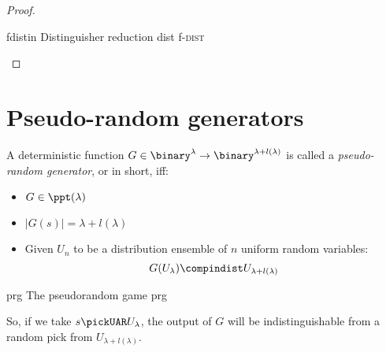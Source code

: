 \begin{proof}
    \begin{cryptoredux}
        {fdistin}
        {Distinguisher reduction}
        {dist}
        {f-\textsc{dist}}
        
      
        

        
    \end{cryptoredux}

\end{proof}


\section{Pseudo-random generators}

A deterministic function $G \in \binary^\lambda \to \binary^{\lambda + l(\lambda)}$ is called a \emph{pseudo-random generator}, or \prg{} in short, iff:

\begin{itemize}
    \item $G \in \ppt(\lambda)$
    \item $|G(s)| = \lambda + l(\lambda)$ %
    \item Given $U_n$ to be a distribution ensemble of $n$ uniform random variables:
    \[
        G(U_{\lambda}) \compindist U_{\lambda + l(\lambda)}
    \]
\end{itemize}

\begin{cryptogame}
    {prg}
    {The pseudorandom game}
    {prg}
    

    \cseqdelay

    
\end{cryptogame}

So, if we take $s \pickUAR U_\lambda$, the output of $G$ will be indistinguishable from a random pick from $U_{\lambda + l(\lambda)}$.

